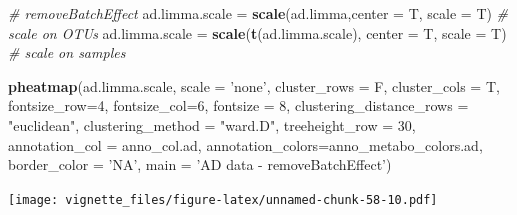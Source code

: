 \documentclass[]{book}
\newenvironment{Shaded}{\begin{snugshade}}{\end{snugshade}}
\newcommand{\KeywordTok}[1]{\textcolor[rgb]{0.13,0.29,0.53}{\textbf{#1}}}
\newcommand{\DataTypeTok}[1]{\textcolor[rgb]{0.13,0.29,0.53}{#1}}
\newcommand{\DecValTok}[1]{\textcolor[rgb]{0.00,0.00,0.81}{#1}}
\newcommand{\StringTok}[1]{\textcolor[rgb]{0.31,0.60,0.02}{#1}}
\newcommand{\CommentTok}[1]{\textcolor[rgb]{0.56,0.35,0.01}{\textit{#1}}}
\newcommand{\NormalTok}[1]{#1}
\begin{document}
\begin{Shaded}
\begin{Highlighting}[]
\CommentTok{# removeBatchEffect}
\NormalTok{ad.limma.scale =}\StringTok{ }\KeywordTok{scale}\NormalTok{(ad.limma,}\DataTypeTok{center =}\NormalTok{ T, }\DataTypeTok{scale =}\NormalTok{ T) }\CommentTok{# scale on OTUs}
\NormalTok{ad.limma.scale =}\StringTok{ }\KeywordTok{scale}\NormalTok{(}\KeywordTok{t}\NormalTok{(ad.limma.scale), }\DataTypeTok{center =}\NormalTok{ T, }\DataTypeTok{scale =}\NormalTok{ T) }\CommentTok{# scale on samples}

\KeywordTok{pheatmap}\NormalTok{(ad.limma.scale, }
         \DataTypeTok{scale =} \StringTok{'none'}\NormalTok{, }
         \DataTypeTok{cluster_rows =}\NormalTok{ F, }
         \DataTypeTok{cluster_cols =}\NormalTok{ T, }
         \DataTypeTok{fontsize_row=}\DecValTok{4}\NormalTok{, }\DataTypeTok{fontsize_col=}\DecValTok{6}\NormalTok{,}
         \DataTypeTok{fontsize =} \DecValTok{8}\NormalTok{,}
         \DataTypeTok{clustering_distance_rows =} \StringTok{"euclidean"}\NormalTok{,}
         \DataTypeTok{clustering_method =} \StringTok{"ward.D"}\NormalTok{,}
         \DataTypeTok{treeheight_row =} \DecValTok{30}\NormalTok{,}
         \DataTypeTok{annotation_col =}\NormalTok{ anno_col.ad,}
         \DataTypeTok{annotation_colors=}\NormalTok{anno_metabo_colors.ad,}
         \DataTypeTok{border_color =} \StringTok{'NA'}\NormalTok{,}
         \DataTypeTok{main =} \StringTok{'AD data - removeBatchEffect'}\NormalTok{)}
\end{Highlighting}
\end{Shaded}

\texttt{[image: vignette\_files/figure-latex/unnamed-chunk-58-10.pdf]}
\end{document}
